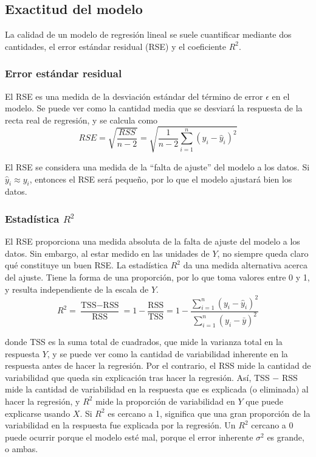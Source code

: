 \subsection{Exactitud del modelo}

La calidad de un modelo de regresión lineal se suele cuantificar mediante dos cantidades, el error estándar residual (RSE) y el coeficiente $R^2$. 

\subsubsection{Error estándar residual}

El RSE es una medida de la desviación estándar del término de error $\epsilon$ en el modelo. Se puede ver como la cantidad media que se desviará la respuesta de la recta real de regresión, y se calcula como 
\begin{equation}
RSE = \sqrt{\frac{RSS}{n-2}} = \sqrt{\frac{1}{n-2} \sum_{i=1}^n (y_i - \hat{y}_i)^2} 
\label{eq:3.15}
\end{equation}

El RSE se considera una medida de la ``falta de ajuste'' del modelo a los datos. Si $\hat{y}_i \approx y_i$, entonces el RSE será pequeño, por lo que el modelo ajustará bien los datos.

\subsubsection{Estadística $R^2$}

El RSE proporciona una medida absoluta de la falta de ajuste del modelo a los datos. Sin embargo, al estar medido en las unidades de $Y$, no siempre queda claro qué constituye un buen RSE. La estadística $R^2$  da una medida alternativa acerca del ajuste. Tiene la forma de una proporción, por lo que toma valores entre 0 y 1, y resulta independiente de la escala de $Y$. 
\begin{equation}
R^2 = \frac{\text{TSS} - \text{RSS}}{\text{RSS}} = 1 - \frac{\text{RSS}}{\text{TSS}} = 1 - \frac{\sum_{i=1}^n (y_i - \hat{y}_i)^2}{\sum_{i=1}^n (y_i - \bar{y})^2}
\end{equation}

\noindent donde TSS es la suma total de cuadrados, que mide la varianza total en la respuesta $Y$, y se puede ver como la cantidad de variabilidad inherente en la respuesta antes de hacer la regresión. Por el contrario, el RSS mide la cantidad de variabilidad que queda sin explicación tras hacer la regresión. Así, TSS $-$ RSS mide la cantidad de variabilidad en la respuesta que es explicada (o eliminada) al hacer la regresión, y $R^2$ mide la proporción de variabilidad en $Y$ que puede explicarse usando $X$. Si $R^2$ es cercano a 1, significa que una gran proporción de la variabilidad en la respuesta fue explicada por la regresión. Un $R^2$ cercano a 0 puede ocurrir porque el modelo esté mal,  porque el error inherente $\sigma^2$ es grande, o ambas. \\

